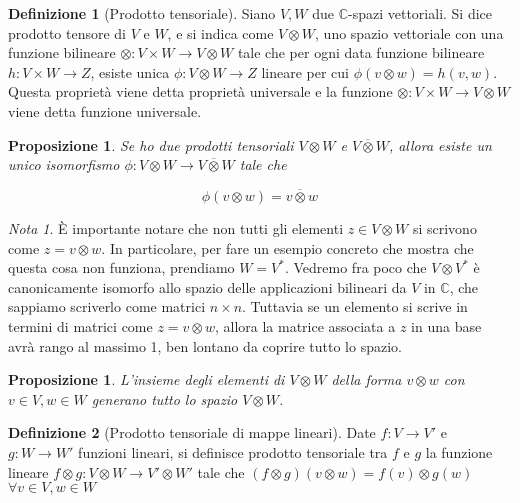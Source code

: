 \documentclass[11pt]{article}
\theoremstyle{plain}
\newtheorem{prop}[thm]{Proposizione}
\theoremstyle{definition}
\newtheorem{defn}{Definizione}[section]
\theoremstyle{remark}
\newtheorem*{note}{Nota}
\newcommand{\C}{\mathbb{C}}
\begin{document}
\begin{defn}[Prodotto tensoriale]
   Siano $V, W$ due $\mathbb{C}$-spazi vettoriali. Si dice prodotto tensore di $V$ e $W$, 
   e si indica come $V\otimes W$, uno spazio vettoriale con una funzione bilineare 
   $\otimes: V \times W \to V\otimes W$ tale che per ogni data funzione bilineare $h: V\times W \to  Z$,
   esiste unica $\phi: V\otimes W \to Z$ lineare per cui $\phi(v \otimes w)=h(v,w)$.
   Questa proprietà viene detta proprietà universale e la funzione $\otimes: V \times W \to V\otimes W$
   viene detta funzione universale.



\label{defn:prodotto tensoriale}
\end{defn}


\begin{prop}
Se ho due prodotti tensoriali $V \otimes W$ e $V \overline{\otimes} W$, allora esiste un unico isomorfismo 
$\phi: V \otimes W \to V \overline{\otimes} W$ tale che

\[ \phi (v\otimes w) = v \overline{\otimes} w\]
\end{prop}


\begin{note}
\`E importante notare che non tutti gli elementi $z \in V \otimes W$ si scrivono come $z = v \otimes w$. In particolare, per fare un esempio concreto che mostra che questa cosa non funziona, prendiamo $W = V^*$. Vedremo fra poco che $V\otimes V^*$ è canonicamente isomorfo allo spazio delle applicazioni bilineari da $V$ in $\C$, che sappiamo scriverlo come matrici $n\times n$. Tuttavia se un elemento si scrive in termini di matrici come $z = v\otimes w$, allora la matrice associata a $z$ in una base avrà rango al massimo 1, ben lontano da coprire tutto lo spazio.
\end{note}


\begin{prop}
L'insieme degli elementi di $V\otimes W$ della forma $v\otimes w$ con $v\in V, w\in W$ generano tutto lo spazio $V\otimes W$.
\end{prop}


\begin{defn}[Prodotto tensoriale di mappe lineari]
Date $f:V \to V'$ e $g:W \to W'$ funzioni lineari, si definisce prodotto tensoriale tra $f$ e $g$ la funzione lineare $f \otimes g : V \otimes W \to V' \otimes W'$ tale che $(f \otimes g)(v \otimes w)=f(v) \otimes g(w)$ $\forall v\in V, w\in W$

\end{defn}
\end{document}
